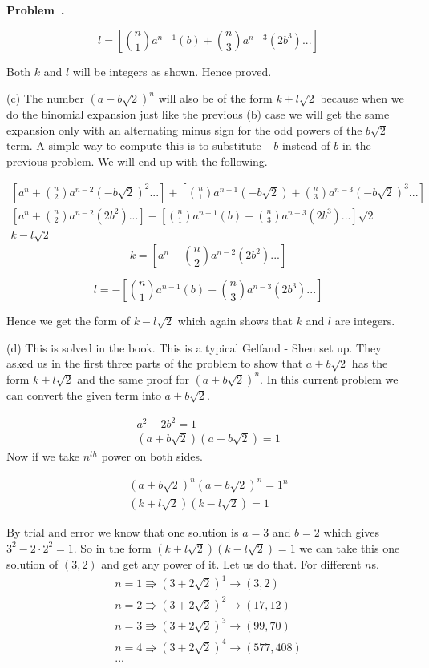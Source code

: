 \documentclass[10pt]{article}
\newcounter{problem}
\newenvironment{problem}[1][]{
  \refstepcounter{problem}
  \par\noindent\textbf{Problem~\theproblem. #1}\par
  \vspace{0.5em}
}{\vspace{1em}}
\begin{document}
\begin{problem}
  \[
  l = \left[\binom{n}{1} a^{n - 1} (b) + \binom{n}{3} a^{n - 3} (2b^3) ...\right]
  \]

  Both $k$ and $l$ will be integers as shown. Hence proved.

  (c)
  The number $(a - b\sqrt{2})^n$ will also be of the form $k +l\sqrt{2}$ because when we do the binomial expansion just like the previous (b) case 
  we will get the same expansion only with an alternating minus sign for the odd powers of the $b\sqrt{2}$ term. A simple way 
  to compute this is to substitute $-b$ instead of $b$ in the previous problem. We will end up with the following.

  \begin{gather*}
    \left[a^n + \binom{n}{2} a^{n - 2} (-b\sqrt{2})^2 ...\right] + \left[\binom{n}{1} a^{n - 1} (-b\sqrt{2}) + \binom{n}{3} a^{n - 3} (-b\sqrt{2})^3 ...\right]\\
    \left[a^n + \binom{n}{2} a^{n - 2} (2b^2) ...\right] - \left[\binom{n}{1} a^{n - 1} (b) + \binom{n}{3} a^{n - 3} (2b^3) ...\right]\sqrt{2}\\
    k - l\sqrt{2}
  \end{gather*}
  \[
  k = \left[a^n + \binom{n}{2} a^{n - 2} (2b^2) ...\right] 
  \]

  \[
  l = -\left[\binom{n}{1} a^{n - 1} (b) + \binom{n}{3} a^{n - 3} (2b^3) ...\right]
  \]

  Hence we get the form of $k -l\sqrt{2}$ which again shows that $k$ and $l$ are integers.

  (d)
  This is solved in the book. This is a typical Gelfand - Shen set up. They asked us in the first three parts of the problem to show 
  that $a + b \sqrt{2}$ has the form $k + l\sqrt{2}$ and the same proof for $(a + b\sqrt{2})^n$. In this current problem we can convert the given 
  term into $a + b\sqrt{2}$.

  \begin{gather*}
    a^2 - 2b^2  = 1\\
    (a + b\sqrt{2}) (a - b\sqrt{2}) = 1
  \end{gather*}
  Now if we take $n^{th}$ power on both sides.

  \begin{gather*}
    (a + b\sqrt{2})^n (a - b\sqrt{2})^n = 1^n\\
    (k + l\sqrt{2}) (k - l\sqrt{2}) = 1
  \end{gather*}

  By trial and error we know that one solution is $a = 3$ and $b = 2$ which gives $3^2 - 2 \cdot 2^2 = 1$.
  So in the form $(k + l\sqrt{2}) (k - l\sqrt{2}) = 1$ we can take this one  solution of $(3, 2)$ and get any power of it. Let us do that. 
  For different $n$s.
  \begin{gather*}
    n = 1 \Rrightarrow (3 + 2\sqrt{2})^1 \rightarrow (3, 2)\\
    n = 2 \Rrightarrow (3 + 2\sqrt{2})^2 \rightarrow (17, 12)\\
    n = 3 \Rrightarrow (3 + 2\sqrt{2})^3 \rightarrow (99, 70)\\
    n = 4 \Rrightarrow (3 + 2\sqrt{2})^4 \rightarrow (577, 408)\\
    ...
  \end{gather*}


\end{problem}
\end{document}

